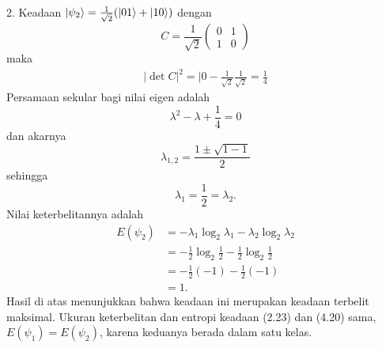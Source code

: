2. Keadaan $\ket{\psi_2}=\frac{1}{\sqrt{2}}(\ket{01}+\ket{10})$ dengan
\begin{equation}
	C=\frac{1}{\sqrt{2}}
	\begin{pmatrix}
		0&1\\
		1&0
	\end{pmatrix}
\end{equation}
maka
\begin{equation}
	\begin{aligned}
		|\det C|^2=|0-\frac{1}{\sqrt{2}}\frac{1}{\sqrt{2}}=\frac{1}{4}
	\end{aligned}
\end{equation}
Persamaan sekular bagi nilai eigen adalah
\begin{equation}
	\lambda^2-\lambda+\frac{1}{4}=0
\end{equation}
dan akarnya
\begin{equation}
	\lambda_{1,2}=\frac{1\pm\sqrt{1-1}}{2}
\end{equation}
sehingga
\begin{equation}
	\lambda_1=\frac{1}{2}=\lambda_2.
\end{equation}
Nilai keterbelitannya adalah
\begin{equation}
	\begin{aligned}
		E(\psi_2)
		&=-\lambda_1\log_2\lambda_1-\lambda_2\log_2\lambda_2\\
		&=-\frac{1}{2}\log_2\frac{1}{2}-\frac{1}{2}\log_2\frac{1}{2}\\
		&=-\frac{1}{2}(-1)-\frac{1}{2}(-1)\\
		&=1.
	\end{aligned}
\end{equation}
Hasil di atas menunjukkan bahwa keadaan ini merupakan keadaan terbelit maksimal. Ukuran keterbelitan dan entropi keadaan (2.23) dan (4.20) sama, $E(\psi_1)=E(\psi_2)$, karena keduanya berada dalam satu kelas.

